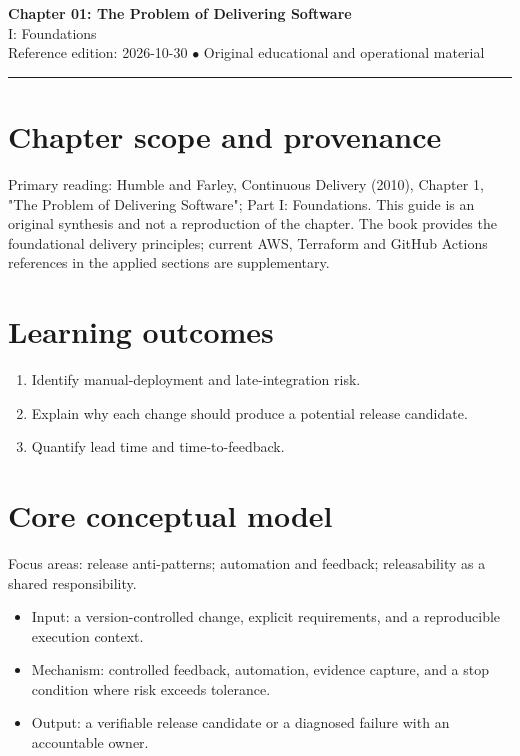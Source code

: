 \documentclass[10pt,letterpaper]{article}
\begin{document}
\begin{center}
{\LARGE\bfseries\color{cdblue}Chapter 01: The Problem of Delivering Software}\\[7pt]
{\large I: Foundations}\\[6pt]
{\small Reference edition: 2026-10-30 $\bullet$ Original educational and operational material}
\end{center}
\noindent\color{cdblue}\rule{\linewidth}{1.2pt}\color{black}
\vspace{0.4em}
\section{Chapter scope and provenance}
Primary reading: Humble and Farley, Continuous Delivery (2010), Chapter 1, "The Problem of Delivering Software"; Part I: Foundations. This guide is an original synthesis and not a reproduction of the chapter. The book provides the foundational delivery principles; current AWS, Terraform and GitHub Actions references in the applied sections are supplementary.


\section{Learning outcomes}
\begin{enumerate}
\item Identify manual-deployment and late-integration risk.
\item Explain why each change should produce a potential release candidate.
\item Quantify lead time and time-to-feedback.
\end{enumerate}

\section{Core conceptual model}
Focus areas: release anti-patterns; automation and feedback; releasability as a shared responsibility.

\begin{itemize}
\item Input: a version-controlled change, explicit requirements, and a reproducible execution context.
\item Mechanism: controlled feedback, automation, evidence capture, and a stop condition where risk exceeds tolerance.
\item Output: a verifiable release candidate or a diagnosed failure with an accountable owner.
\end{itemize}
\end{document}
